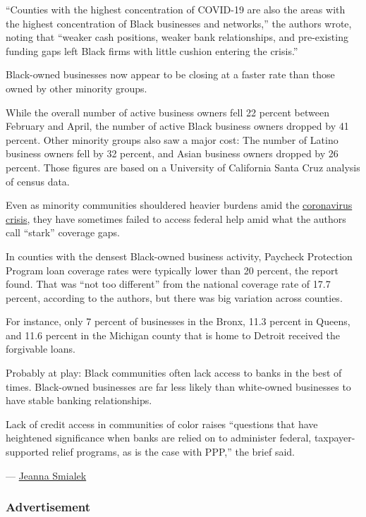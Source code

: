 ``Counties with the highest concentration of COVID-19 are also the areas
with the highest concentration of Black businesses and networks,'' the
authors wrote, noting that ``weaker cash positions, weaker bank
relationships, and pre-existing funding gaps left Black firms with
little cushion entering the crisis.''

Black-owned businesses now appear to be closing at a faster rate than
those owned by other minority groups.

While the overall number of active business owners fell 22 percent
between February and April, the number of active Black business owners
dropped by 41 percent. Other minority groups also saw a major cost: The
number of Latino business owners fell by 32 percent, and Asian business
owners dropped by 26 percent. Those figures are based on a University of
California Santa Cruz analysis of census data.

Even as minority communities shouldered heavier burdens amid the
\href{https://www.nytimes3xbfgragh.onion/2020/04/07/us/coronavirus-race.html}{coronavirus
crisis}, they have sometimes failed to access federal help amid what the
authors call ``stark'' coverage gaps.

In counties with the densest Black-owned business activity, Paycheck
Protection Program loan coverage rates were typically lower than 20
percent, the report found. That was ``not too different'' from the
national coverage rate of 17.7 percent, according to the authors, but
there was big variation across counties.

For instance, only 7 percent of businesses in the Bronx, 11.3 percent in
Queens, and 11.6 percent in the Michigan county that is home to Detroit
received the forgivable loans.

Probably at play: Black communities often lack access to banks in the
best of times. Black-owned businesses are far less likely than
white-owned businesses to have stable banking relationships.

Lack of credit access in communities of color raises ``questions that
have heightened significance when banks are relied on to administer
federal, taxpayer-supported relief programs, as is the case with PPP,''
the brief said.

--- \href{https://www.nytimes3xbfgragh.onion/by/jeanna-smialek}{Jeanna
Smialek}

\hypertarget{advertisement}{%
\subsubsection{Advertisement}\label{advertisement}}

